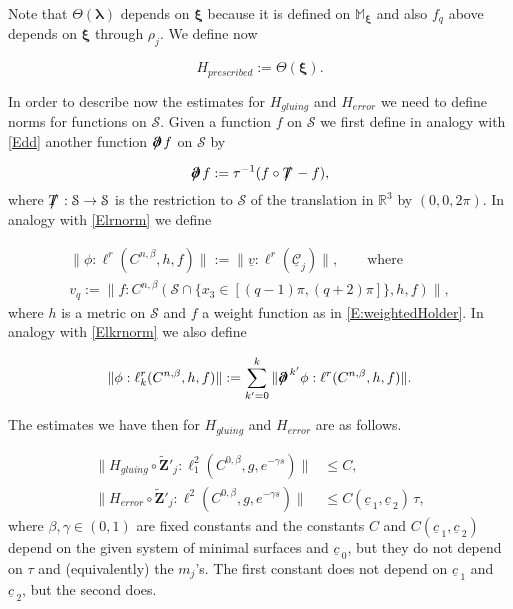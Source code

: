 \documentclass[12pt,namelimits,sumlimits]{amsart}
\theoremstyle{remark}
\numberwithin{equation}{section}
\begin{document}
Note that $\Theta({\boldsymbol{\lambda}})$ depends on ${{\boldsymbol{\xi}}}$ because it is defined on ${\mathbb{M}}_{{\boldsymbol{\xi}}}$
and also $f_q$ above depends on ${{\boldsymbol{\xi}}}$ through $\rho_j$.
We define now
\addtocounter{theorem}{1}
\begin{equation}
\label{EHprescribed}
{{H_{prescribed}}}:=\Theta({{\boldsymbol{\xi}}}).
\end{equation}

In order to describe now the estimates for ${{H_{gluing}}}$ and ${{H_{error}}}$ we need to define norms
for functions on ${{\mathcal{S}}}$.
Given a function $f$ on ${{\mathcal{S}}}$ we first define in analogy with \ref{Edd}
another function ${{\boldsymbol{\partial}\mspace{.8mu}\!\!\!\!\boldsymbol{/}\,}} f$ on ${{\mathcal{S}}}$ by
\addtocounter{theorem}{1}
\begin{equation}
\label{Eddf}
{{\boldsymbol{\partial}\mspace{.8mu}\!\!\!\!\boldsymbol{/}\,}} f:=\tau^{-1}(f\circ{{T\mspace{0.9mu}\!\!\!\!\boldsymbol{/}\,}}-f),
\end{equation}
where ${{T\mspace{0.9mu}\!\!\!\!\boldsymbol{/}\,}}:{{\mathcal{S}}}\to{{\mathcal{S}}}$ is the restriction to ${{\mathcal{S}}}$ of the translation in ${{{\mathbb{R}}^3}}$ by $(0,0,2\pi)$.
In analogy with \ref{Elrnorm}
we define 
\addtocounter{theorem}{1}
\begin{equation}
\label{Elrnormf}
\begin{aligned}
\|\phi:\ell^r(C^{n,\beta},h,f)\|:=
\|\underline{v}:\ell^r({\underline{{\mathcal{C}}}}_j)\|,
\qquad\text{where}\quad
\\
v_q:=\|f:C^{n,\beta}({{\mathcal{S}}}\cap \{x_3\in[(q-1)\pi,(q+2)\pi]\},h,f)\|,
\end{aligned}
\end{equation}
where $h$ is a metric on ${{\mathcal{S}}}$ and $f$ a weight function as in 
\ref{E:weightedHolder}.
In analogy with \ref{Elkrnorm} we also define
\addtocounter{theorem}{1}
\begin{equation}
\label{Elkrnormf}
\|\phi:\ell^r_k(C^{n,\beta},h,f)\|:=
\sum_{k'=0}^k
\|{{\boldsymbol{\partial}\mspace{.8mu}\!\!\!\!\boldsymbol{/}\,}}^{k'}
\phi:\ell^r(C^{n,\beta},h,f)\|.
\end{equation}

The estimates we have then for ${{H_{gluing}}}$ and ${{H_{error}}}$ are as follows.
\addtocounter{theorem}{1}
\begin{equation}
\label{EHestimates}
\begin{aligned}
\|{{H_{gluing}}}
\circ {\widetilde{\boldsymbol{Z}}}'_j
:
\ell^2_1(C^{0,\beta},g,e^{-\gamma s})
\|
&\le
C,
\\
\|{{H_{error}}}
\circ {\widetilde{\boldsymbol{Z}}}'_j
:
\ell^2(C^{0,\beta},g,e^{-\gamma s})
\|
&\le
C({\underline{c}\,}_1,{\underline{c}\,}_2) \,\tau,
\end{aligned}
\end{equation}
where $\beta,\gamma\in (0,1)$ are fixed constants
and  the constants $C$ and $C({\underline{c}\,}_1,{\underline{c}\,}_2)$
depend on the given system of minimal surfaces and ${\underline{c}\,}_0$,
but they do not depend on $\tau$ and (equivalently) the $m_j$'s.
The first constant does not depend on ${\underline{c}\,}_1$ and ${\underline{c}\,}_2$,
but the second does.
\end{document}
